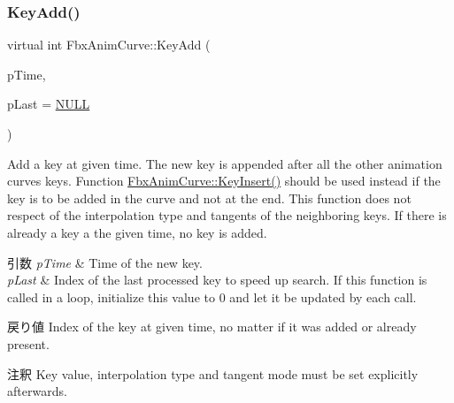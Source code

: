 \mbox{\label{class_fbx_anim_curve_a96e4e0437fc18712b785e7370ab5184e}} 
\subsubsection{\texorpdfstring{Key\+Add()}{KeyAdd()}\hspace{0.1cm}{\footnotesize\ttfamily [2/2]}}
{\footnotesize\ttfamily virtual int Fbx\+Anim\+Curve\+::\+Key\+Add (\begin{DoxyParamCaption}\item[{\hyperlink{class_fbx_time}{Fbx\+Time}}]{p\+Time,  }\item[{int $\ast$}]{p\+Last = {\ttfamily \hyperlink{fbxarch_8h_a070d2ce7b6bb7e5c05602aa8c308d0c4}{N\+U\+LL}} }\end{DoxyParamCaption})\hspace{0.3cm}{\ttfamily [pure virtual]}}

Add a key at given time. The new key is appended after all the other animation curve\textquotesingle{}s keys. Function \hyperlink{class_fbx_anim_curve_aaad0086794bde7063d868956c6fc6b3f}{Fbx\+Anim\+Curve\+::\+Key\+Insert()} should be used instead if the key is to be added in the curve and not at the end. This function does not respect of the interpolation type and tangents of the neighboring keys. If there is already a key a the given time, no key is added.


\begin{DoxyParams}{引数}
{\em p\+Time} & Time of the new key. \\
\hline
{\em p\+Last} & Index of the last processed key to speed up search. If this function is called in a loop, initialize this value to 0 and let it be updated by each call. \\
\hline
\end{DoxyParams}
\begin{DoxyReturn}{戻り値}
Index of the key at given time, no matter if it was added or already present. 
\end{DoxyReturn}
\begin{DoxyRemark}{注釈}
Key value, interpolation type and tangent mode must be set explicitly afterwards. 
\end{DoxyRemark}
\mbox{\label{class_fbx_anim_curve_a202883ab5e1844beb60d40137464afd8}} 
